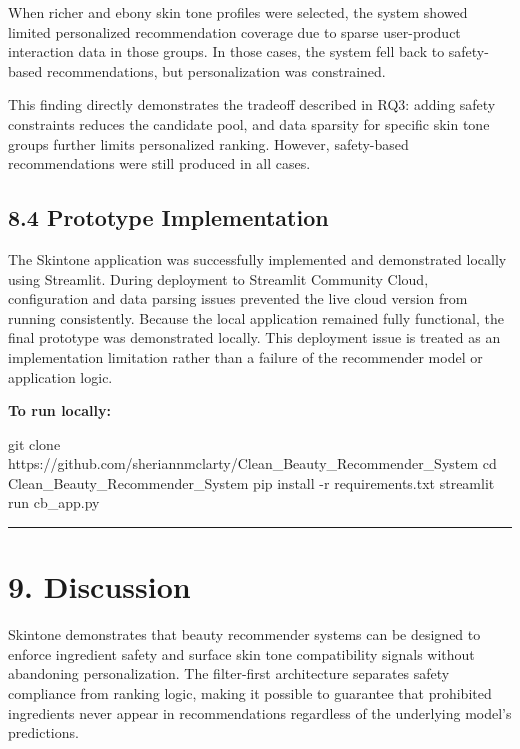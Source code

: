 \documentclass[
  letterpaper,
  DIV=11,
  numbers=noendperiod]{scrartcl}
\newenvironment{Shaded}{\begin{snugshade}}{\end{snugshade}}
\newcommand{\AttributeTok}[1]{\textcolor[rgb]{0.40,0.45,0.13}{#1}}
\newcommand{\BuiltInTok}[1]{\textcolor[rgb]{0.00,0.23,0.31}{#1}}
\newcommand{\ExtensionTok}[1]{\textcolor[rgb]{0.00,0.23,0.31}{#1}}
\newcommand{\FunctionTok}[1]{\textcolor[rgb]{0.28,0.35,0.67}{#1}}
\newcommand{\NormalTok}[1]{\textcolor[rgb]{0.00,0.23,0.31}{#1}}
\begin{document}
When richer and ebony skin tone profiles were selected, the system
showed limited personalized recommendation coverage due to sparse
user-product interaction data in those groups. In those cases, the
system fell back to safety-based recommendations, but personalization
was constrained.

This finding directly demonstrates the tradeoff described in RQ3: adding
safety constraints reduces the candidate pool, and data sparsity for
specific skin tone groups further limits personalized ranking. However,
safety-based recommendations were still produced in all cases.

\subsection{8.4 Prototype
Implementation}\label{prototype-implementation}

The Skintone application was successfully implemented and demonstrated
locally using Streamlit. During deployment to Streamlit Community Cloud,
configuration and data parsing issues prevented the live cloud version
from running consistently. Because the local application remained fully
functional, the final prototype was demonstrated locally. This
deployment issue is treated as an implementation limitation rather than
a failure of the recommender model or application logic.

\textbf{To run locally:}

\begin{Shaded}
\begin{Highlighting}[]
\FunctionTok{git}\NormalTok{ clone https://github.com/sheriannmclarty/Clean\_Beauty\_Recommender\_System}
\BuiltInTok{cd}\NormalTok{ Clean\_Beauty\_Recommender\_System}
\ExtensionTok{pip}\NormalTok{ install }\AttributeTok{{-}r}\NormalTok{ requirements.txt}
\ExtensionTok{streamlit}\NormalTok{ run cb\_app.py}
\end{Highlighting}
\end{Shaded}

\begin{center}\rule{0.5\linewidth}{0.5pt}\end{center}

\section{9. Discussion}\label{discussion}

Skintone demonstrates that beauty recommender systems can be designed to
enforce ingredient safety and surface skin tone compatibility signals
without abandoning personalization. The filter-first architecture
separates safety compliance from ranking logic, making it possible to
guarantee that prohibited ingredients never appear in recommendations
regardless of the underlying model's predictions.
\end{document}
